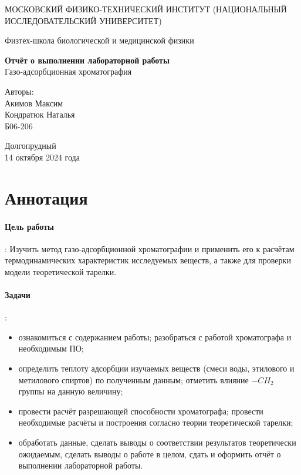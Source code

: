 \documentclass{article}
\begin{document}
\begin{titlepage}
	\begin{center}
		{\large МОСКОВСКИЙ ФИЗИКО-ТЕХНИЧЕСКИЙ ИНСТИТУТ (НАЦИОНАЛЬНЫЙ ИССЛЕДОВАТЕЛЬСКИЙ УНИВЕРСИТЕТ)}
	\end{center}
	\begin{center}
		{\large Физтех-школа биологической и медицинской физики}
	\end{center}
	
	
	\vspace{4.5cm}
	{\huge
		\begin{center}
			{\bf Отчёт о выполнении лабораторной работы}\\
			Газо-адсорбционная хроматография
		\end{center}
	}
	\vspace{3cm}
	\begin{flushright}
		{\LARGE Авторы:\\ Акимов Максим \\ Кондратюк Наталья \\
			\vspace{0.5cm}
			Б06-206}
	\end{flushright}
	\vspace{3cm}
	\begin{center}
		Долгопрудный 
       \\14 октября 2024 года
	\end{center}
 
\end{titlepage}

\newpage 
\section{Аннотация}

\paragraph*{Цель работы}: Изучить метод газо-адсорбционной хроматографии и применить его к расчётам термодинамических характеристик исследуемых веществ, а также для проверки модели теоретической тарелки.

\paragraph*{Задачи}:
\begin{itemize}
    \item ознакомиться с содержанием работы; разобраться с работой хроматографа и необходимым ПО;
    \item определить теплоту адсорбции изучаемых веществ (смеси воды, этилового и метилового спиртов) по полученным данным; отметить влияние $-CH_2$ группы на данную величину;
    \item провести расчёт разрешающей способности хроматографа; провести необходимые расчёты и построения согласно теории теоретической тарелки;
    \item обработать данные, сделать выводы о соответствии результатов теоретически ожидаемым, сделать выводы о работе в целом, сдать и оформить отчёт о выполнении лабораторной работы.
\end{itemize}
\end{document}
